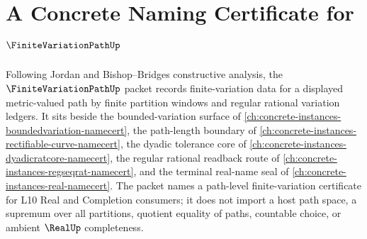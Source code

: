 \chapter{A Concrete Naming Certificate for $\FiniteVariationPathUp$}
\label{ch:concrete-instances-finite-variation-path-namecert}

Following Jordan and Bishop--Bridges constructive analysis, the $\FiniteVariationPathUp$ packet records finite-variation data for a displayed metric-valued path by finite partition windows and regular rational variation ledgers. It sits beside the bounded-variation surface of \autoref{ch:concrete-instances-boundedvariation-namecert}, the path-length boundary of \autoref{ch:concrete-instances-rectifiable-curve-namecert}, the dyadic tolerance core of \autoref{ch:concrete-instances-dyadicratcore-namecert}, the regular rational readback route of \autoref{ch:concrete-instances-regseqrat-namecert}, and the terminal real-name seal of \autoref{ch:concrete-instances-real-namecert}. The packet names a path-level finite-variation certificate for L10 Real and Completion consumers; it does not import a host path space, a supremum over all partitions, quotient equality of paths, countable choice, or ambient $\RealUp$ completeness.

